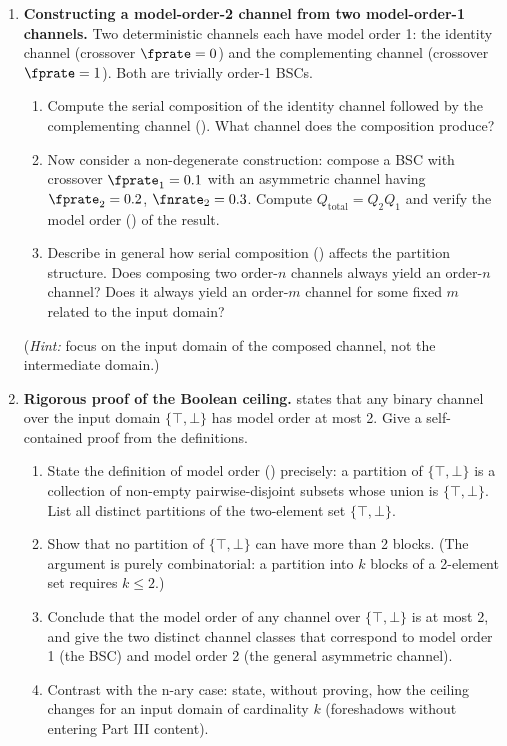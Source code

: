 \begin{enumerate}
\item \exstarstar
\textbf{Constructing a model-order-2 channel from two model-order-1 channels.}
Two deterministic channels each have model order 1: the identity channel
(crossover $\fprate = 0$) and the complementing channel (crossover $\fprate = 1$).
Both are trivially order-1 BSCs.
\begin{enumerate}
  \item[(a)] Compute the serial composition of the identity channel followed
    by the complementing channel ().
    What channel does the composition produce?
  \item[(b)] Now consider a non-degenerate construction: compose a BSC with
    crossover $\fprate_1 = 0.1$ with an asymmetric channel having
    $\fprate_2 = 0.2$, $\fnrate_2 = 0.3$.
    Compute $Q_{\mathrm{total}} = Q_2 Q_1$ and verify the model order
    () of the result.
  \item[(c)] Describe in general how serial composition ()
    affects the partition structure. Does composing two order-$n$ channels
    always yield an order-$n$ channel? Does it always yield an order-$m$
    channel for some fixed $m$ related to the input domain?
\end{enumerate}
(\textit{Hint:} focus on the input domain of the composed channel, not
the intermediate domain.)


\item \exstarstarstar
\textbf{Rigorous proof of the Boolean ceiling.}
 states that any binary channel over the input
domain $\{\top, \bot\}$ has model order at most 2. Give a self-contained
proof from the definitions.
\begin{enumerate}
  \item[(a)] State the definition of model order ()
    precisely: a partition of $\{\top, \bot\}$ is a collection of non-empty
    pairwise-disjoint subsets whose union is $\{\top, \bot\}$. List all
    distinct partitions of the two-element set $\{\top, \bot\}$.
  \item[(b)] Show that no partition of $\{\top, \bot\}$ can have more than
    2 blocks. (The argument is purely combinatorial: a partition into $k$
    blocks of a 2-element set requires $k \leq 2$.)
  \item[(c)] Conclude that the model order of any channel over $\{\top, \bot\}$
    is at most 2, and give the two distinct channel classes that correspond
    to model order 1 (the BSC) and model order 2 (the general asymmetric
    channel).
  \item[(d)] Contrast with the n-ary case: state, without proving, how the
    ceiling changes for an input domain of cardinality $k$ (foreshadows
     without entering Part III content).
\end{enumerate}


\end{enumerate}
